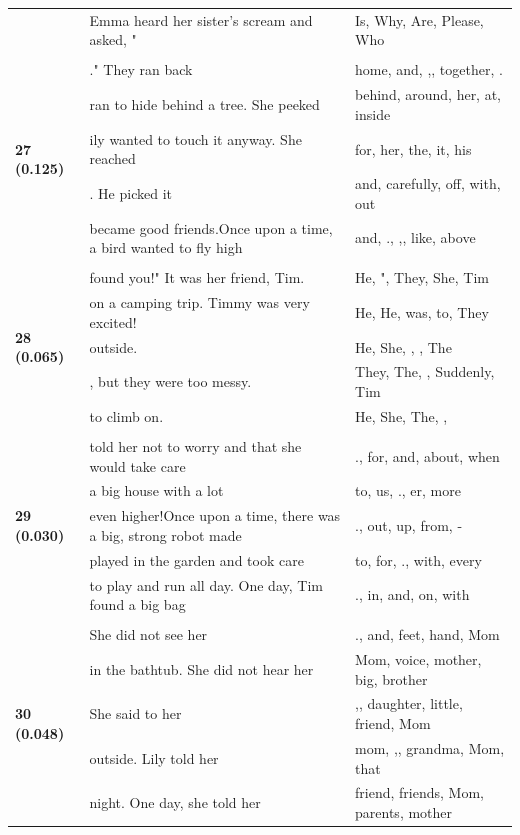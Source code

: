 \documentclass{article}
\theoremstyle{plain}
\theoremstyle{definition}
\theoremstyle{remark}
\begin{document}
\begin{longtable}{|p{}|p{}|p{}|}
& Emma heard her sister's scream and asked, " & Is, Why, Are, Please, Who \\
& & \\
\multirow{5}{*}{\textbf{27 (0.125)}} & ."  They ran back & home,  and, ,,  together, . \\
& ran to hide behind a tree. She peeked & behind,  around,  her,  at,  inside \\
& ily wanted to touch it anyway. She reached & for,  her,  the,  it,  his \\
& . He picked it & and,  carefully,  off,  with,  out \\
& became good friends.Once upon a time, a bird wanted to fly high & and, ., ,,  like,  above \\
& & \\
\multirow{5}{*}{\textbf{28 (0.065)}} & found you!" It was her friend, Tim. & He,  ",  They,  She,  Tim \\
& on a camping trip. Timmy was very excited! & He, He, was, to,  They \\
& outside. & He,  She,   ,  ,  The \\
& , but they were too messy. & They,  The,   ,  Suddenly,  Tim \\
& to climb on. & He,  She,  The,   , \\
& & \\
\multirow{5}{*}{\textbf{29 (0.030)}} & told her not to worry and that she would take care & .,  for,  and,  about,  when \\
& a big house with a lot & to, us, ., er,  more \\
& even higher!Once upon a time, there was a big, strong robot made & .,  out,  up,  from, - \\
& played in the garden and took care & to,  for, .,  with,  every \\
& to play and run all day. One day, Tim found a big bag & .,  in,  and,  on,  with \\
& & \\
\multirow{5}{*}{\textbf{30 (0.048)}} & She did not see her & .,  and,  feet,  hand,  Mom \\
& in the bathtub.  She did not hear her & Mom,  voice,  mother,  big,  brother \\
& She said to her & ,,  daughter,  little,  friend,  Mom \\
& outside.   Lily told her & mom, ,,  grandma,  Mom,  that \\
& night. One day, she told her & friend,  friends,  Mom,  parents,  mother \\

\end{longtable}
\end{document}
